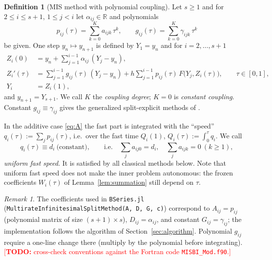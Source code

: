 \documentclass[11pt,a4paper]{article}
\theoremstyle{definition}
\newtheorem{definition}[theorem]{Definition}
\theoremstyle{remark}
\newtheorem{remark}[theorem]{Remark}
\newcommand{\R}{\mathbb{R}}
\newcommand{\todo}[1]{\textcolor{red}{[\textbf{TODO:} #1]}}
\begin{document}
\begin{definition}[MIS method with polynomial coupling]\label{def:mis}
Let $s\ge1$ and for $2\le i\le s+1$, $1\le j<i$ let $\alpha_{ij}\in\R$
and polynomials
\begin{equation*}
 p_{ij}(\tau)=\sum_{k=0}^{K}a_{ijk}\,\tau^k,\qquad
 g_{ij}(\tau)=\sum_{k=0}^{K}\gamma_{ijk}\,\tau^k
\end{equation*}
be given. One step $y_n\mapsto y_{n+1}$ is defined by $Y_1=y_n$ and for
$i=2,\dots,s+1$
\begin{align}
 Z_i(0) &= y_n+\sum_{j=1}^{i-1}\alpha_{ij}\,(Y_j-y_n), \label{eq:mis1}\\
 Z_i'(\tau) &= \sum_{j=1}^{i-1}g_{ij}(\tau)\,(Y_j-y_n)
   + h\sum_{j=1}^{i-1}p_{ij}(\tau)\,F\big(Y_j,Z_i(\tau)\big),
   \qquad \tau\in[0,1], \label{eq:mis2}\\
 Y_i &= Z_i(1), \label{eq:mis3}
\end{align}
and $y_{n+1}=Y_{s+1}$. We call $K$ the \emph{coupling degree}; $K=0$ is
\emph{constant coupling}. Constant $g_{ij}\equiv\gamma_{ij}$ gives the
generalized split-explicit methods of \cite{KnothWensch2014}.
\end{definition}

In the additive case \eqref{eq:A} the fast part is integrated with the
``speed'' $q_i(\tau):=\sum_jp_{ij}(\tau)$, i.e.\ over the fast time
$Q_i(1)$, $Q_i(\tau):=\int_0^\tau q_i$. We call
\begin{equation}\label{eq:internalconsistency}
 q_i(\tau)\equiv d_i \ \text{(constant)},\qquad\text{i.e.}\quad
 \sum_j a_{ij0}=d_i,\quad \sum_ja_{ijk}=0\ (k\ge1),
\end{equation}
\emph{uniform fast speed}. It is satisfied by all classical methods
below. Note that uniform fast speed does not make the inner problem
autonomous: the frozen coefficients $W_i(\tau)$ of
Lemma~\ref{lem:summation} still depend on $\tau$.

\begin{remark}
The coefficients used in \texttt{BSeries.jl}
(\texttt{MultirateInfinitesimalSplitMethod(A, D, G, c)}) correspond to
$A_{ij}=p_{ij}$ (polynomial matrix of size $(s+1)\times s$),
$D_{ij}=\alpha_{ij}$, and constant $G_{ij}=\gamma_{ij}$; the
implementation \cite{KetchesonRanocha2023} follows the algorithm of
Section~\ref{sec:algorithm}. Polynomial $g_{ij}$ require a one-line
change there (multiply by the polynomial before integrating).
\todo{cross-check conventions against the Fortran code
\texttt{MISBI\_Mod.f90}.}
\end{remark}
\end{document}
